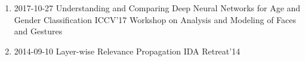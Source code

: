 {\begin{enumerate}
                    {2019-02-22}
                    {AI -- Opening the Black Box}
                    {Technology Innovation Day -- 91 Years HHI}
    \item {}
                    {2017-10-27}
                    {Understanding and Comparing Deep Neural Networks for Age and Gender Classification}
                    {ICCV'17 Workshop on Analysis and Modeling of Faces and Gestures}
    \item {}
                    {2014-09-10}
                    {Layer-wise Relevance Propagation}
                    {IDA Retreat'14}
\end{enumerate}
}
